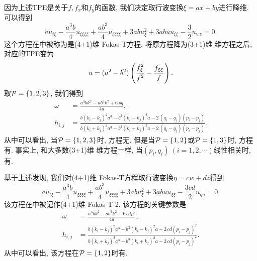 因为上述TPE是关于$f,f_x$和$f_y$的函数, 我们决定取行波变换$\xi=ax+by$进行降维. 可以得到
\begin{equation}
    au_{t\xi}-\frac{a^3b}{4}u_{\xi\xi\xi\xi}+\frac{ab^3}{4}u_{\xi\xi\xi\xi}+3abu_{\xi}^2+3abuu_{\xi\xi}-\frac{3}{2}u_{wz}=0.  \label{Fokas-T}
\end{equation}
这个方程在中被称为是(4+1)维 Fokas-T方程. 将原方程降为(3+1)维 维方程之后, 对应的TPE变为
\begin{equation}
    u=(a^2-b^2)\left(\frac{f_{\xi}^2}{f^2}-\frac{f_{\xi\xi}}{f}\right).
\end{equation}
取$\mathcal{P}=\{1,2,3\}$, 我们得到
\begin{equation}
\begin{split}
    \omega&={\frac {{a}^{3}b{k}^{2}-a{b}^{3}{k}^{2}+6\,pq}{4a}}, \\
    h_{{i,j}}&={\frac {b \left( k_{{i}}-k_{{j}} \right) ^{2}{a}^{3}-{b}^{3}
    \left( k_{{i}}-k_{{j}} \right) ^{2}a-2\, \left( q_{{i}}-q_{{j}}
    \right)  \left( p_{{i}}-p_{{j}} \right) }{b \left( k_{{i}}+k_{{j}}
    \right) ^{2}{a}^{3}-{b}^{3} \left( k_{{i}}+k_{{j}} \right) ^{2}a-2\,
    \left( q_{{i}}-q_{{j}} \right)  \left( p_{{i}}-p_{{j}} \right) }}.
\end{split}
\end{equation}
从中可以看出, 当$\mathcal{P}=\{1,2,3\}$时, 方程无\TrueSol{}. 但是当$\mathcal{P}=\{1,2\}$或$\mathcal{P}=\{1,3\}$时, 方程有\TrueSol{}. 事实上, 和大多数(3+1)维 维方程一样, 当$(p_i,q_i)~(i=1,2,\cdots)$线性相关时, 有\TrueSol{}.

基于上述发现, 我们对(4+1)维 Fokas-T方程取行波变换$\eta=cw+dz$得到
\begin{equation}
    au_{t\xi}-\frac{a^3b}{4}u_{\xi\xi\xi\xi}+\frac{ab^3}{4}u_{\xi\xi\xi\xi}+3abu_{\xi}^2+3abuu_{\xi\xi}-\frac{3cd}{2}u_{\eta\eta}=0.  \label{Fokas-T-2}
\end{equation}
该方程在中被记作(4+1)维 Fokas-T-2. 该方程的关键参数是
\begin{equation}
\begin{split}
    \omega&={\frac {{a}^{3}b{k}^{2}-a{b}^{3}{k}^{2}+6\,cd{p}^{2}}{4a}}, \\ 
    h_{{i,j}}&={\frac {b \left( k_{{i}}-k_{{j}} \right) ^{2}{a}^{3}-{b}^{3}
    \left( k_{{i}}-k_{{j}} \right) ^{2}a-2\,cd \left( p_{{i}}-p_{{j}}
    \right) ^{2}}{b \left( k_{{i}}+k_{{j}} \right) ^{2}{a}^{3}-{b}^{3}
    \left( k_{{i}}+k_{{j}} \right) ^{2}a-2\,cd \left( p_{{i}}-p_{{j}}
    \right) ^{2}}}.
\end{split}
\end{equation}
从中可以看出, 该方程在$\mathcal{P}=\{1,2\}$时有\TrueSol{}.

